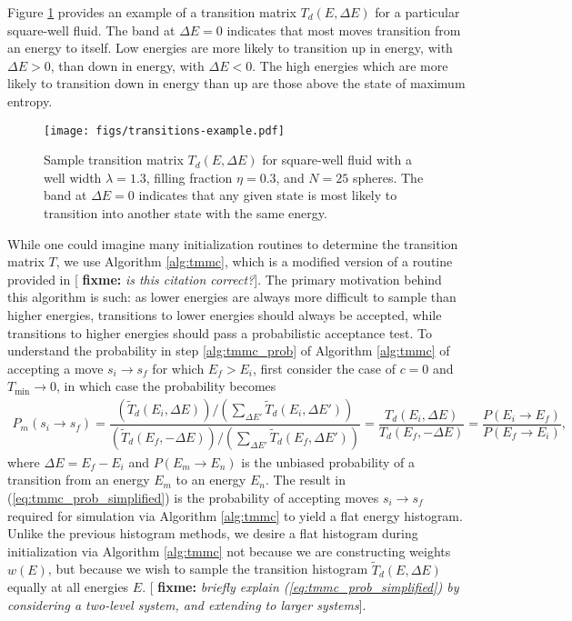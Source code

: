 \documentclass[11pt]{article}
\renewcommand{\t}{\text} %
\newcommand{\f}[2]{\dfrac{#1}{#2}} %
\newcommand{\p}[1]{\left(#1\right)} %
\newcommand{\red}[1]{{\bf \color{red} #1}}
\newcommand{\fixme}[1]{[\red{fixme:} \emph{#1}]}
\begin{document}
Figure \ref{fig:transitions_sample} provides an example of a
transition matrix $T_d\p{E,\Delta E}$ for a particular square-well
fluid. The band at $\Delta E=0$ indicates that most moves transition
from an energy to itself. Low energies are more likely to transition
up in energy, with $\Delta E>0$, than down in energy, with $\Delta
E<0$. The high energies which are more likely to transition down in
energy than up are those above the state of maximum entropy.

\begin{figure}
  \centering
  \texttt{[image: figs/transitions-example.pdf]}
  \caption[Transition matrix]
  {Sample transition matrix $T_d\p{E,\Delta E}$ for square-well fluid
    with a well width $\lambda=1.3$, filling fraction $\eta=0.3$, and
    $N=25$ spheres.  The band at $\Delta E=0$ indicates that any given
    state is most likely to transition into another state with the
    same energy.}
  \label{fig:transitions_sample}
\end{figure}

While one could imagine many initialization routines to determine the
transition matrix $T$, we use Algorithm \ref{alg:tmmc}, which is a
modified version of a routine provided in \cite{tmmc_prl}\fixme{is
  this citation correct?}. The primary motivation behind this
algorithm is such: as lower energies are always more difficult to
sample than higher energies, transitions to lower energies should
always be accepted, while transitions to higher energies should pass a
probabilistic acceptance test. To understand the probability in step
\ref{alg:tmmc_prob} of Algorithm \ref{alg:tmmc} of accepting a move
$s_i\to s_f$ for which $E_f>E_i$, first consider the case of $c=0$ and
$T_{\t{min}}\to0$, in which case the probability becomes
\begin{align}
  P_m\p{s_i\to s_f}=\f{\p{\tilde T_d\p{E_i,\Delta E}}\big/
    \p{\sum_{\Delta E'}\tilde T_d\p{E_i,\Delta E'}}} {\p{\tilde
      T_d\p{E_f,-\Delta E}}\big/ \p{\sum_{\Delta E'}\tilde
      T_d\p{E_f,\Delta E'}}} =\f{T_d\p{E_i,\Delta
      E}}{T_d\p{E_f,-\Delta E}} =\f{P\p{E_i\to E_f}}{P\p{E_f\to E_i}},
  \label{eq:tmmc_prob_simplified}
\end{align}
where $\Delta E=E_f-E_i$ and $P\p{E_m\to E_n}$ is the unbiased
probability of a transition from an energy $E_m$ to an energy
$E_n$. The result in (\ref{eq:tmmc_prob_simplified}) is the
probability of accepting moves $s_i\to s_f$ required for simulation
via Algorithm \ref{alg:tmmc} to yield a flat energy
histogram\cite{tmmc}. Unlike the previous histogram methods, we desire
a flat histogram during initialization via Algorithm \ref{alg:tmmc}
not because we are constructing weights $w\p{E}$, but because we wish
to sample the transition histogram $\tilde T_d\p{E,\Delta E}$ equally
at all energies $E$. \fixme{briefly explain
  (\ref{eq:tmmc_prob_simplified}) by considering a two-level system,
  and extending to larger systems}.
\end{document}
